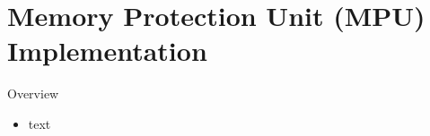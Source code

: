 
\section{Memory Protection Unit (MPU) Implementation}

\begin{frame}{Overview}
    \begin{itemize}
        \item text
    \end{itemize}
\end{frame}
